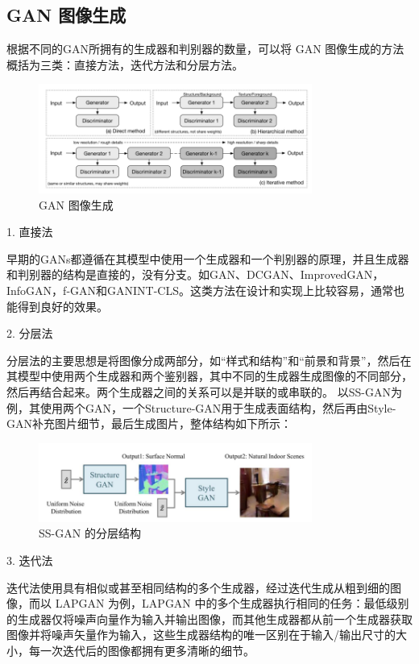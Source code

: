 \subsection{GAN 图像生成}

根据不同的GAN所拥有的生成器和判别器的数量，可以将 GAN 图像生成的方法概括为三类：直接方法，迭代方法和分层方法。

\begin{figure}[htb]
\centering 
\includegraphics[width=0.8\textwidth]{img/m2t3.png} 
\caption{GAN 图像生成}
\label{Test}
\end{figure}

1. 直接法

早期的GANs都遵循在其模型中使用一个生成器和一个判别器的原理，并且生成器和判别器的结构是直接的，没有分支。如GAN、DCGAN、ImprovedGAN，InfoGAN，f-GAN和GANINT-CLS。这类方法在设计和实现上比较容易，通常也能得到良好的效果。

2. 分层法

分层法的主要思想是将图像分成两部分，如“样式和结构”和“前景和背景”，然后在其模型中使用两个生成器和两个鉴别器，其中不同的生成器生成图像的不同部分，然后再结合起来。两个生成器之间的关系可以是并联的或串联的。
以SS-GAN为例，其使用两个GAN，一个Structure-GAN用于生成表面结构，然后再由Style-GAN补充图片细节，最后生成图片，整体结构如下所示：

\begin{figure}[htb]
\centering 
\includegraphics[width=0.8\textwidth]{img/m2t4.png} 
\caption{SS-GAN 的分层结构}
\label{Test}
\end{figure}

3. 迭代法

迭代法使用具有相似或甚至相同结构的多个生成器，经过迭代生成从粗到细的图像，而以 LAPGAN 为例，LAPGAN 中的多个生成器执行相同的任务：最低级别的生成器仅将噪声向量作为输入并输出图像，而其他生成器都从前一个生成器获取图像并将噪声矢量作为输入，这些生成器结构的唯一区别在于输入/输出尺寸的大小，每一次迭代后的图像都拥有更多清晰的细节。


